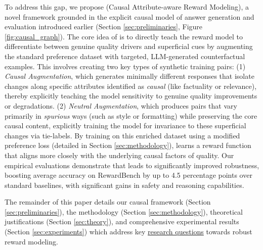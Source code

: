 To address this gap, we propose \textbf{\carma{}} (Causal Attribute-aware Reward Modeling), a novel framework grounded in the explicit causal model of answer generation and evaluation introduced earlier (Section \ref{sec:preliminaries}, Figure \ref{fig:causal_graph}). The core idea of \carma{} is to directly teach the reward model to differentiate between genuine quality drivers and superficial cues by augmenting the standard preference dataset with targeted, LLM-generated counterfactual examples. This involves creating two key types of synthetic training pairs: (1) \textit{Causal Augmentation}, which generates minimally different responses that isolate changes along specific attributes identified as \textit{causal} (like factuality or relevance), thereby explicitly teaching the model sensitivity to genuine quality improvements or degradations. (2) \textit{Neutral Augmentation}, which produces pairs that vary primarily in \textit{spurious} ways (such as style or formatting) while preserving the core causal content, explicitly training the model for invariance to these superficial changes via tie-labels. By training on this enriched dataset using a modified preference loss (detailed in Section \ref{sec:methodology}), \carma{} learns a reward function that aligns more closely with the underlying causal factors of quality. %
Our empirical evaluations demonstrate that \carma{} leads to significantly improved robustness, boosting average accuracy on RewardBench by up to 4.5 percentage points over standard baselines, with significant gains in safety and reasoning capabilities.

The remainder of this paper details our causal framework (Section \ref{sec:preliminaries}), the \carma{} methodology (Section \ref{sec:methodology}), theoretical justifications (Section \ref{sec:theory}), and comprehensive experimental results (Section \ref{sec:experiments}) which address key \hyperref[list:research_questions]{research questions} towards robust reward modeling.

